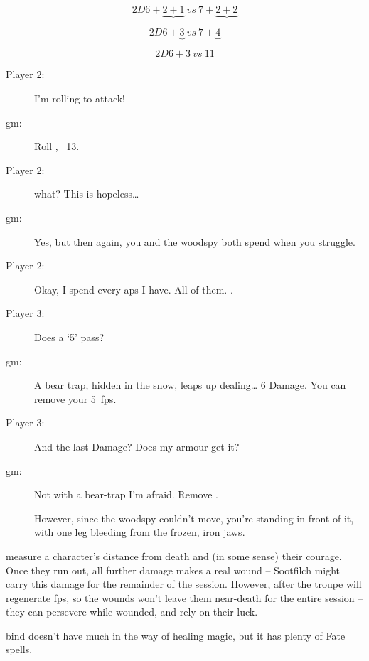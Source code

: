 \begin{multicols}{3}
$$2D6 + \underbrace{2 + 1} ~vs~ 7 + \underbrace{2 + 2}$$

$$2D6 + \underbrace{3} ~vs~ 7 + \underbrace{4}$$

$$2D6+3 ~vs~ 11$$


\bigLine
\vspace{\baselineskip}


\begin{description}
  \item[Player 2:]
  I'm rolling to attack!
  \item[\gls{gm}:]
  Roll , ~13.
  \item[Player 2:]
   what?
  This is hopeless\ldots
  \item[\gls{gm}:]
  Yes, but then again, you and the \gls{woodspy} both spend  when you struggle.
  \item[Player 2:]
  Okay, I spend every \glspl{ap} I have.
  All of them.
  .
  \item[Player 3:]
  Does a `5' pass?
  \item[\gls{gm}:]
  A bear trap, hidden in the snow, leaps up dealing\ldots{} 6 Damage.
  You can remove your 5~\glspl{fp}.
  \item[Player 3:]
  And the last Damage?
  Does my armour get it?
  \item[\gls{gm}:]
  Not with a bear-trap I'm afraid.
  Remove .

  However, since the \gls{woodspy} couldn't move, you're standing in front of it, with one leg bleeding from the frozen, iron jaws.
\end{description}

\bigLine
\vspace{\baselineskip}

 measure a character's distance from death and (in some sense) their courage.
Once they run out, all further damage makes a real wound -- Sootfilch might carry this damage for the remainder of the session.
However, after  the troupe will regenerate \glspl{fp}, so the wounds won't leave them near-death for the entire session -- they can persevere while wounded, and rely on their luck.

\Gls{bind} doesn't have much in the way of healing magic, but it has plenty of Fate spells.


\bigLine
\vspace{\baselineskip}



\end{multicols}
